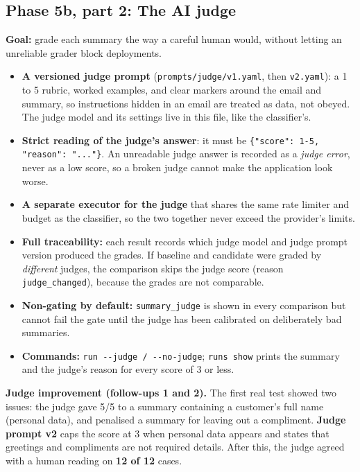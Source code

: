 \documentclass[11pt,a4paper]{article}
\newcommand{\code}[1]{\nolinkurl{#1}}
\begin{document}
\subsection{Phase 5b, part 2: The AI judge}
\textbf{Goal:} grade each summary the way a careful human would, without letting an unreliable
grader block deployments.
\begin{itemize}
  \item \textbf{A versioned judge prompt} (\code{prompts/judge/v1.yaml}, then \code{v2.yaml}):
        a 1 to 5 rubric, worked examples, and clear markers around the email and summary, so
        instructions hidden in an email are treated as data, not obeyed. The judge model and
        its settings live in this file, like the classifier's.
  \item \textbf{Strict reading of the judge's answer}: it must be
        \texttt{\{"score": 1-5, "reason": "..."\}}. An unreadable judge answer is recorded as a
        \emph{judge error}, never as a low score, so a broken judge cannot make the application
        look worse.
  \item \textbf{A separate executor for the judge} that shares the same rate limiter and budget
        as the classifier, so the two together never exceed the provider's limits.
  \item \textbf{Full traceability:} each result records which judge model and judge prompt
        version produced the grades. If baseline and candidate were graded by \emph{different}
        judges, the comparison skips the judge score (reason \code{judge_changed}), because the
        grades are not comparable.
  \item \textbf{Non-gating by default:} \code{summary_judge} is shown in every comparison but
        cannot fail the gate until the judge has been calibrated on deliberately bad summaries.
  \item \textbf{Commands:} \texttt{run -{}-judge / -{}-no-judge}; \texttt{runs show} prints the
        summary and the judge's reason for every score of 3 or less.
\end{itemize}
\textbf{Judge improvement (follow-ups 1 and 2).} The first real test showed two issues: the
judge gave 5/5 to a summary containing a customer's full name (personal data), and penalised a
summary for leaving out a compliment. \textbf{Judge prompt v2} caps the score at 3 when
personal data appears and states that greetings and compliments are not required details.
After this, the judge agreed with a human reading on \textbf{12 of 12} cases.
\end{document}
